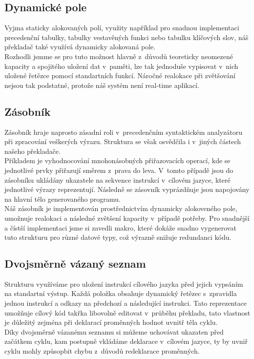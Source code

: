 \documentclass[11pt]{article}
\begin{document}
    \subsection{Dynamické pole}
        Vyjma staticky alokovaných polí, využity například pro snadnou implementaci precedenční tabulky, tabulky vestavěných funkci nebo tabulku klíčových slov, náš překladač také využívá dynamicky alokovaná pole. \\
        \indent Rozhodli jsmme se pro tuto možnost hlavně z~důvodů teoreticky neomezené kapacity a spojitého uložení dat v~paměti, lze tak jednoduše vypisovat v~nich uložené řetězce pomocí standartních funkcí. Náročné realokace při zvětšování nejsou tak podstatné, protože náš systém není real-time aplikací.
    
    \subsection{Zásobník}
        Zásobník hraje naprosto zásadní roli v~precedenčním syntaktickém analyzátoru při zpracování veškerých výrazu. Struktura se však osvědčila i v~jiných částech našeho překladače. \\
        \indent Příkladem je vyhodnocování mnohonásobných přiřazovacích operací, kde se jednotlivé prvky přiřazují směrem z~prava do leva. V~tomto případě jsou do zásobníku ukládány ukazatele na sekvence instrukcí v~cílovém jazyce, které jednotlivé výrazy reprezentují. Následně se zásovník vyprázdňuje jsou napojovány na hlavní tělo generovaného programu. \\
        \indent Náš zásobník je implementován prostřednictvím dynamicky alokoveného pole, umožnuje realokaci a následné zvětšení kapacity v~případě potřeby. Pro snadnější a čístší implementaci jsme si zavedli makro, které dokáže snadno vygenerovat tuto strukturu pro různé datové typy, což výrazně snižuje redundanci kódu.
        
    \subsection{Dvojsměrně vázaný seznam}
    \label{sec:dll}

        Strukturu využíváme pro uložení instrukcí cílového jazyka před jejich vypsáním na standartní výstup. Každá položka obsahuje dynamický řetězec s~zpravidla jednou instrukcí a odkazy na předchozí a následující instrukci. Tato reprezentace umožňuje cílový kód takřka libovolně editovat v~průběhu překladu, tato vlastnost je důležitý zejména při deklarací proměnných hodnot uvnitř těla cyklu. \\
        \indent Díky dvojsměrně vázanému seznamu si můžeme uchovávat ukazaten před začátkem cyklu, kam postupně vkládáme deklarace v~cílovém jazyce, ty by uvniř cyklu mohly způsopbit chybu z~důvodů redeklarace proměnných.
        
\end{document}
